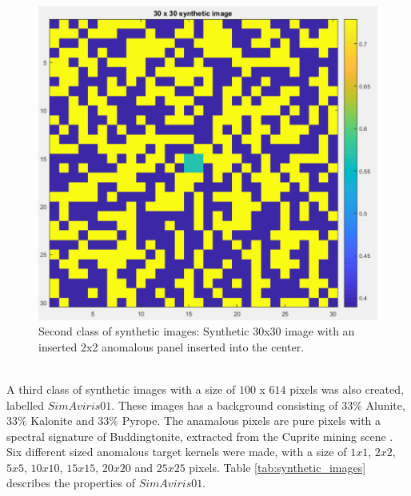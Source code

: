 \begin{figure}[H]
\centering
   \includegraphics[scale=0.4]{images/AD_testing/synthetic_images/30_30_anomaly_image.PNG}
  \caption{Second class of synthetic images: Synthetic 30x30 image with an inserted 2x2 anomalous panel inserted into the center.} 
  \label{fig:synthetic_30_30}
\end{figure}


\\
A third class of synthetic images with a size of $100$ x $614$ pixels was also created, labelled $SimAviris01$. These images has a background consisting of $33\%$ Alunite, $33\%$ Kalonite and $33\%$ Pyrope. The anamalous pixels are pure pixels with a spectral signature of Buddingtonite, extracted from the Cuprite mining scene \cite{ground_truth_cuprite}. Six different sized anomalous target kernels were made, with a size of $1x1$, $2x2$, $5x5$, $10x10$, $15x15$, $20x20$ and $25x25$ pixels. Table \ref{tab:synthetic_images} describes the properties of $SimAviris01$.




